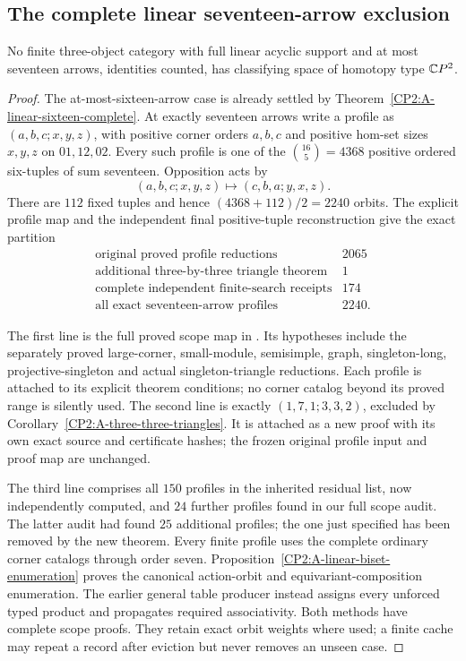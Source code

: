 \subsection{The complete linear seventeen-arrow exclusion}

\begin{theorem}
\label{CP2:A-linear-seventeen-complete}
No finite three-object category with full linear acyclic support
and at most seventeen arrows, identities counted, has classifying
space of homotopy type $\mathbb{C}P^2$.
\end{theorem}
\begin{proof}
The at-most-sixteen-arrow case is already settled by
Theorem~\ref{CP2:A-linear-sixteen-complete}. At exactly seventeen
arrows write a profile as $(a,b,c;x,y,z)$, with positive corner
orders $a,b,c$ and positive hom-set sizes $x,y,z$ on $01,12,02$.
Every such profile is one of the $\binom{16}{5}=4368$ positive
ordered six-tuples of sum seventeen. Opposition acts by
\[
 (a,b,c;x,y,z)\longmapsto(c,b,a;y,x,z).
\]
There are $112$ fixed tuples and hence $(4368+112)/2=2240$
orbits. The explicit profile map and the independent final
positive-tuple reconstruction give the exact partition
\[
\begin{array}{l|r}
\text{original proved profile reductions}&2065\\
\text{additional three-by-three triangle theorem}&1\\
\text{complete independent finite-search receipts}&174\\\hline
\text{all exact seventeen-arrow profiles}&2240.
\end{array}
\]

The first line is the full proved scope map in
.
Its hypotheses include the separately proved large-corner,
small-module, semisimple, graph, singleton-long,
projective-singleton and actual singleton-triangle reductions.
Each profile is attached to its explicit theorem conditions;
no corner catalog beyond its proved range is silently used.
The second line is exactly $(1,7,1;3,3,2)$, excluded by
Corollary~\ref{CP2:A-three-three-triangles}. It is attached as a
new proof with its own exact source and certificate hashes;
the frozen original profile input and proof map are unchanged.

The third line comprises all $150$ profiles in the inherited
residual list, now independently computed, and $24$ further
profiles found in our full scope audit. The latter audit had
found $25$ additional profiles; the one just specified has
been removed by the new theorem. Every finite profile uses
the complete ordinary corner catalogs through order seven.
Proposition~\ref{CP2:A-linear-biset-enumeration} proves the
canonical action-orbit and equivariant-composition enumeration.
The earlier general table producer instead assigns every
unforced typed product and propagates required associativity.
Both methods have complete scope proofs. They retain exact
orbit weights where used; a finite cache may repeat a record
after eviction but never removes an unseen case.


\end{proof}
